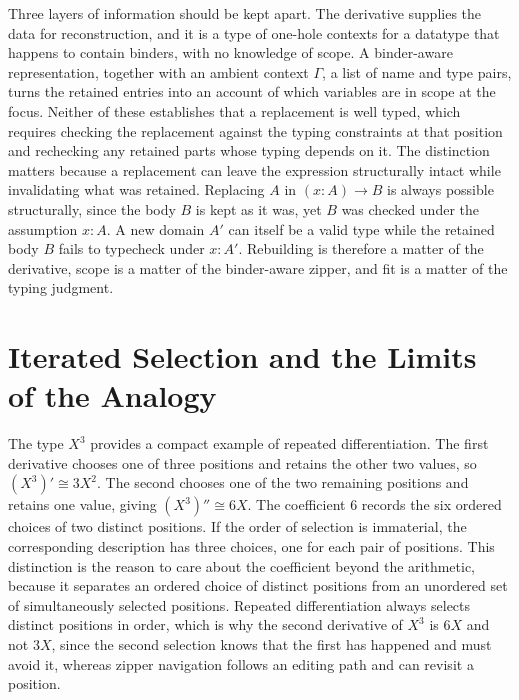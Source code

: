 \documentclass[11pt]{article}
\begin{document}
Three layers of information should be kept apart. The derivative supplies the data for reconstruction, and it is a type of one-hole contexts for a datatype that happens to contain binders, with no knowledge of scope. A binder-aware representation, together with an ambient context $\Gamma$, a list of name and type pairs, turns the retained entries into an account of which variables are in scope at the focus. Neither of these establishes that a replacement is well typed, which requires checking the replacement against the typing constraints at that position and rechecking any retained parts whose typing depends on it. The distinction matters because a replacement can leave the expression structurally intact while invalidating what was retained. Replacing $A$ in $(x{:}A)\to B$ is always possible structurally, since the body $B$ is kept as it was, yet $B$ was checked under the assumption $x{:}A$. A new domain $A'$ can itself be a valid type while the retained body $B$ fails to typecheck under $x{:}A'$. Rebuilding is therefore a matter of the derivative, scope is a matter of the binder-aware zipper, and fit is a matter of the typing judgment.

\section{Iterated Selection and the Limits of the Analogy}

The type $X^3$ provides a compact example of repeated differentiation. The first derivative chooses one of three positions and retains the other two values, so $(X^3)'\cong 3X^2$. The second chooses one of the two remaining positions and retains one value, giving $(X^3)''\cong 6X$. The coefficient $6$ records the six ordered choices of two distinct positions. If the order of selection is immaterial, the corresponding description has three choices, one for each pair of positions. This distinction is the reason to care about the coefficient beyond the arithmetic, because it separates an ordered choice of distinct positions from an unordered set of simultaneously selected positions. Repeated differentiation always selects distinct positions in order, which is why the second derivative of $X^3$ is $6X$ and not $3X$, since the second selection knows that the first has happened and must avoid it, whereas zipper navigation follows an editing path and can revisit a position.
\end{document}
